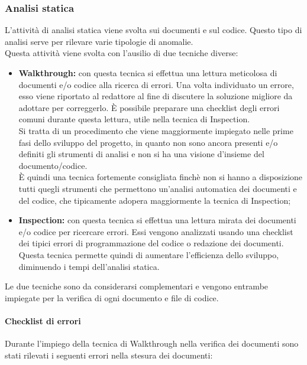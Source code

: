 \subsubsection{Analisi statica}\label{paragraph:analisi_statica}
L'attività di analisi statica viene svolta sui documenti e sul codice. Questo tipo di analisi serve per rilevare varie tipologie di anomalie.\\
Questa attività viene svolta con l'ausilio di due tecniche diverse:
\begin{itemize}
	\item \textbf{Walkthrough:} con questa tecnica si effettua una lettura meticolosa di documenti e/o codice alla ricerca di errori. Una volta individuato un errore, esso viene riportato al redattore al fine di discutere la soluzione migliore da adottare per correggerlo. È possibile preparare una checklist degli errori comuni durante questa lettura, utile nella tecnica di Inspection.\\
	Si tratta di un procedimento che viene maggiormente impiegato nelle prime fasi dello sviluppo del progetto, in quanto non sono ancora presenti e/o definiti gli strumenti di analisi e non si ha una visione d'insieme del documento/codice.\\
	È quindi una tecnica fortemente consigliata finchè non si hanno a disposizione tutti quegli strumenti che permettono un'analisi automatica dei documenti e del codice, che tipicamente adopera maggiormente la tecnica di Inspection;
	\item \textbf{Inspection:} con questa tecnica si effettua una lettura mirata dei documenti e/o codice per ricercare errori. Essi vengono analizzati usando una checklist dei tipici errori di programmazione del codice o redazione dei documenti. Questa tecnica permette quindi di aumentare l'efficienza dello sviluppo, diminuendo i tempi dell'analisi statica.
\end{itemize}
Le due tecniche sono da considerarsi complementari e vengono entrambe impiegate per la verifica di ogni documento e file di codice.
\paragraph{Checklist di errori}
Durante l'impiego della tecnica di Walkthrough nella verifica dei documenti sono stati rilevati i seguenti errori nella stesura dei documenti:

